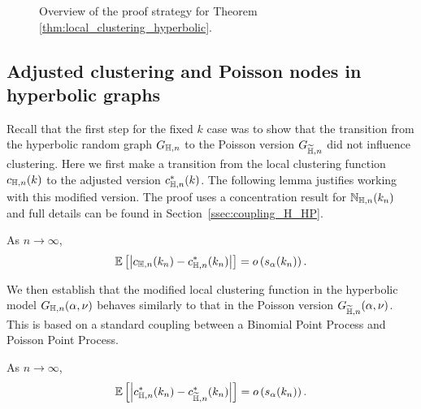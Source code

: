 \begin{figure}[!t]

\caption{Overview of the proof strategy for Theorem \ref{thm:local_clustering_hyperbolic}.}
\label{fig:overview_proof}
\end{figure}


\subsection{Adjusted clustering and Poisson nodes in hyperbolic graphs}

Recall that the first step for the fixed $k$ case was to show that the transition from the hyperbolic random graph $G_{\mathbb{H},n}$ to the Poisson version $G_{\widetilde{\mathbb{H}},n}$ did not influence clustering. Here we first make a transition from the local clustering function $c_{\mathbb{H},n}(k)$ to the adjusted version $c_{\mathbb{H},n}^\ast(k)$. The following lemma justifies working with this modified version. The proof uses a concentration result for $\mathbb{N}_{\mathbb{H},n}(k_n)$ and full details can be found in Section~\ref{ssec:coupling_H_HP}.

\begin{lemma}\label{lem:clustering_ast_H}
As $n \to \infty$,
\[
	\mathbb{E}\left[\left|c_{\mathbb{H},n}(k_n) - c_{\mathbb{H},n}^\ast(k_n)\right|\right] = o\left(s_\alpha(k_n)\right).
\]
\end{lemma}

We then establish that the modified local clustering function in the hyperbolic model $G_{\mathbb{H},n}(\alpha,\nu)$ behaves similarly to that in the Poisson version $G_{\widetilde{\mathbb{H}}, n}(\alpha,\nu)$. This is based on a standard coupling between a Binomial Point Process and Poisson Point Process.

\begin{proposition}\label{prop:clustering_ast_H_Pois}
As $n \to \infty$,
\[
	\mathbb{E}\left[\left|c_{\mathbb{H},n}^\ast(k_n) - c_{\widetilde{\mathbb{H}},n}^\ast(k_n)\right|\right] = o\left(s_\alpha(k_n)\right).
\]
\end{proposition}


